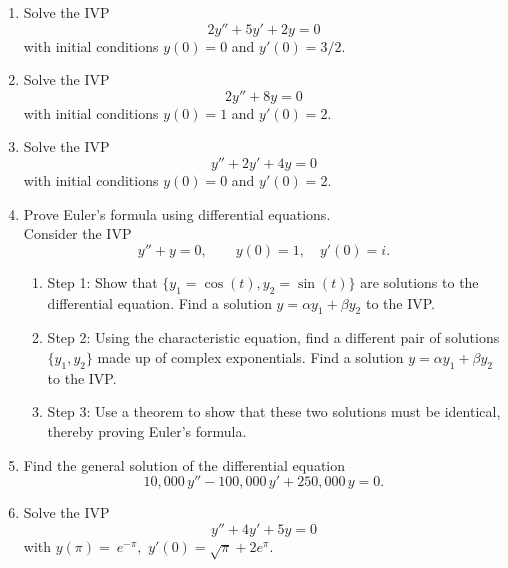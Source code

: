 \documentclass[10pt,driverfallback=hypertex]{report}
\begin{document}
\begin{enumerate}

\item
  Solve the IVP
  \begin{dmath*}
    2 y'' + 5y' + 2y =0
  \end{dmath*}
  with initial conditions $y(0)=0$ and $y'(0)=3/2$.

\item
  Solve the IVP
  \begin{dmath*}
    2 y'' + 8y =0
  \end{dmath*}
  with initial conditions $y(0)=1$ and $y'(0)=2$.

\item
  Solve the IVP
  \begin{dmath*}
    y'' + 2y' + 4y=0
  \end{dmath*}
  with initial conditions $y(0)=0$ and $y'(0)=2$.

\item
  Prove Euler's formula using differential equations. \\
  Consider the IVP
  \begin{dmath*}[compact]
    y'' +y =0, \qquad y(0)=1, \quad y'(0)=i.
  \end{dmath*}
  \begin{enumerate}
    \item Step 1: Show that $\{y_1=\cos(t),y_2=\sin(t)\}$ are solutions
      to the differential equation. Find a solution $y=\alpha y_1 + \beta y_2$
      to the IVP.
    \item Step 2: Using the characteristic equation, find a different pair
      of solutions $\{y_1,y_2\}$ made up of complex exponentials. Find a
      solution $y=\alpha y_1 + \beta y_2$ to the IVP.
    \item Step 3: Use a theorem to show that these two solutions must be
      identical, thereby proving Euler's formula.
  \end{enumerate}

\item
  Find the general solution of the differential equation
  \begin{dmath*}
  10, \! 000 \, y'' - 100, \! 000 \, y' + 250, \! 000 \, y = 0.
  \end{dmath*}


\item
  Solve the IVP
  \begin{dmath*}
    y'' + 4y' + 5y = 0
  \end{dmath*}
  with $y(\pi) =\ e^{-\pi},$ $y' (0) = \sqrt{\pi} + 2e^\pi$.

\end{enumerate}
\end{document}
